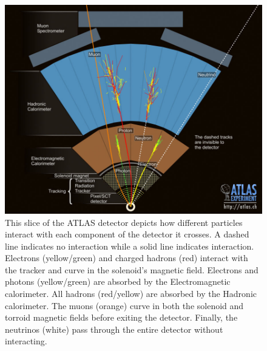 \begin{figure}[!htbp]
  \begin{center}
    \includegraphics[width=0.9\linewidth]{figures/atlas/detector_interactions}
    \caption{This slice of the ATLAS detector depicts how different particles
interact with each component of the detector it crosses.  A dashed line
indicates no interaction while a solid line indicates interaction. Electrons
(yellow/green) and charged hadrons (red) interact with the tracker and curve in
the solenoid's magnetic field.  Electrons and photons (yellow/green) are
absorbed by the Electromagnetic calorimeter.  All hadrons (red/yellow) are
absorbed by the Hadronic calorimeter. The muons (orange) curve in both the
solenoid and torroid magnetic fields before exiting the detector. Finally, the
neutrinos (white) pass through the entire detector without interacting.  }
    \label{fig:detector_interactions}
  \end{center}
\end{figure}

 
 


